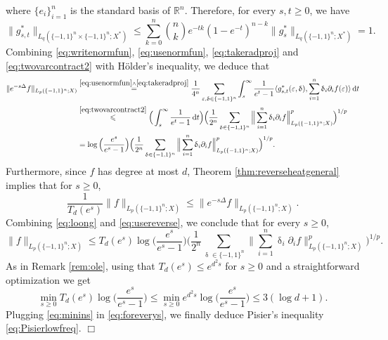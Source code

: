 \documentclass[11pt,reqno]{amsart}
\renewcommand{\leq}{\leqslant}
\renewcommand{\geq}{\geqslant}
\newcommand{\e}{\varepsilon}
\newcommand{\R}{\mathbb R}
\newcommand{\1}{\mathbf 1}
\theoremstyle{remark}
\renewcommand{\delta}{\updelta}
\newcommand*\diff{\mathop{}\!\mathrm{d}}
\begin{document}
where $\{e_i\}_{i=1}^n$ is the standard basis of $\R^n$. Therefore, for every $s, t\geq0$, we have
\begin{equation} \label{eq:twovarcontract2}
\|g_{s,t}^\ast\|_{L_q(\{-1,1\}^n\times\{-1,1\}^n;X^\ast)} \leq \sum_{k=0}^n \binom{n}{k} e^{-tk}(1-e^{-t})^{n-k} \|g_s^\ast\|_{L_q(\{-1,1\}^n;X^\ast)} =1.
\end{equation}
Combining \eqref{eq:writenormfun}, \eqref{eq:usenormfun}, \eqref{eq:takeradproj} and \eqref{eq:twovarcontract2} with H\"older's inequality, we deduce that
\begin{equation} \label{eq:loong}
\begin{split}
\|e^{-s\Delta}f\|_{L_p(\{-1,1\}^n;X)} & \stackrel{\eqref{eq:usenormfun}\wedge\eqref{eq:takeradproj}}{=} \frac{1}{4^n} \sum_{\e,\delta\in\{-1,1\}^n} \int_s^\infty \frac{1}{e^t-1} \langle g_{s,t}^\ast(\e,\delta), \sum_{i=1}^n \delta_i \partial_i f(\e)\rangle \diff t
\\ & \stackrel{\eqref{eq:twovarcontract2}}{\leq} \Big( \int_s^\infty \frac{1}{e^t-1} \diff t\Big) \Big( \frac{1}{2^n}\sum_{\delta\in\{-1,1\}^n} \Big\| \sum_{i=1}^n \delta_i \partial_i f\Big\|^p_{L_p(\{-1,1\}^n;X)}\Big)^{1/p}
\\ & = \log\Big( \frac{e^s}{e^s-1}\Big) \Big( \frac{1}{2^n}\sum_{\delta\in\{-1,1\}^n} \Big\| \sum_{i=1}^n \delta_i \partial_i f\Big\|^p_{L_p(\{-1,1\}^n;X)}\Big)^{1/p}.
\end{split}
\end{equation}
Furthermore, since $f$ has degree at most $d$, Theorem \ref{thm:reverseheatgeneral} implies that for $s\geq0$,
\begin{equation} \label{eq:usereverse}
\frac{1}{T_d(e^s)} \|f\|_{L_p(\{-1,1\}^n;X)} \leq \|e^{-s\Delta}f\|_{L_p(\{-1,1\}^n;X)}.
\end{equation}
Combining \eqref{eq:loong} and \eqref{eq:usereverse}, we conclude that for every $s\geq0$,
\begin{equation} \label{eq:foreverys}
\|f\|_{L_p(\{-1,1\}^n;X)} \leq T_d(e^s)\log\Big( \frac{e^s}{e^s-1}\Big) \Big( \frac{1}{2^n}\sum_{\delta\in\{-1,1\}^n} \Big\| \sum_{i=1}^n \delta_i \partial_i f\Big\|^p_{L_p(\{-1,1\}^n;X)}\Big)^{1/p}.
\end{equation}
As in Remark \ref{rem:ole}, using that $T_d(e^s)\leq e^{d^2s}$ for $s\geq0$ and a straightforward optimization we get
\begin{equation} \label{eq:minins}
\min_{s\geq0} T_d(e^s)\log\Big(\frac{e^s}{e^s-1}\Big) \leq \min_{s\geq0} e^{d^2s} \log\Big(\frac{e^s}{e^s-1}\Big) \leq 3(\log d+1).
\end{equation}
Plugging \eqref{eq:minins} in \eqref{eq:foreverys}, we finally deduce Pisier's inequality \eqref{eq:Pisierlowfreq}.
\hfill$\Box$
\end{document}
